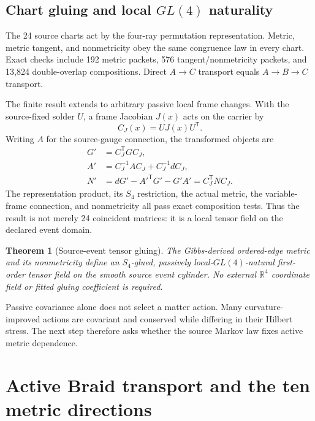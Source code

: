 \documentclass[11pt]{article}
\newtheorem{theorem}{Theorem}[section]
\theoremstyle{definition}
\theoremstyle{remark}
\begin{document}
\subsection{Chart gluing and local $GL(4)$ naturality}

The 24 source charts act by the four-ray permutation representation. Metric, metric tangent, and nonmetricity obey the same congruence law in every chart. Exact checks include 192 metric packets, 576 tangent/nonmetricity packets, and 13,824 double-overlap compositions. Direct $A\to C$ transport equals $A\to B\to C$ transport.

The finite result extends to arbitrary passive local frame changes. With the source-fixed solder $U$, a frame Jacobian $J(x)$ acts on the carrier by
\begin{equation}
 C_J(x)=U J(x)U^{\mathsf T}.
\end{equation}
Writing $A$ for the source-gauge connection, the transformed objects are
\begin{align}
 G'&=C_J^{\mathsf T}GC_J,\\
 A'&=C_J^{-1}AC_J+C_J^{-1}dC_J,\\
 N'&=dG'-A'^{\mathsf T}G'-G'A'=C_J^{\mathsf T}NC_J.
\end{align}
The representation product, its $S_4$ restriction, the actual metric, the variable-frame connection, and nonmetricity all pass exact composition tests. Thus the result is not merely 24 coincident matrices: it is a local tensor field on the declared event domain.

\begin{theorem}[Source-event tensor gluing]\label{thm:tensorglue}
The Gibbs-derived ordered-edge metric and its nonmetricity define an $S_4$-glued, passively local-$GL(4)$-natural first-order tensor field on the smooth source event cylinder. No external $\mathbb R^4$ coordinate field or fitted gluing coefficient is required.
\end{theorem}

Passive covariance alone does not select a matter action. Many curvature-improved actions are covariant and conserved while differing in their Hilbert stress. The next step therefore asks whether the source Markov law fixes active metric dependence.

\section{Active Braid transport and the ten metric directions}
\end{document}
